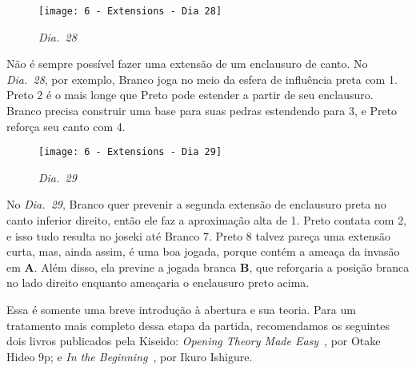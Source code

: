 \pagebreak

\begin{wrapfigure}{r}{60mm}
    \vspace{-15pt}
    \begin{center}
        \texttt{[image: 6 - Extensions - Dia 28]}
        \captionsetup{justification=centering}
        \caption*{\emph{Dia.\@~28}}
    \end{center}
    \vspace{-10pt}
\end{wrapfigure}

Não é sempre possível fazer uma extensão de um enclausuro de canto. No \emph{Dia.\@~28}, por exemplo, Branco joga no meio da esfera de influência preta com 1. Preto 2 é o mais longe que Preto pode estender a partir de seu enclausuro. Branco precisa construir uma base para suas pedras estendendo para 3, e Preto reforça seu canto com 4.

\begin{wrapfigure}{l}{60mm}
    \vspace{-27.5pt}
    \begin{center}
        \texttt{[image: 6 - Extensions - Dia 29]}
        \captionsetup{justification=centering}
        \caption*{\emph{Dia.\@~29}}
    \end{center}
    \vspace{-10pt}
\end{wrapfigure}

No \emph{Dia.\@~29}, Branco quer prevenir a segunda extensão de enclausuro preta no canto inferior direito, então ele faz a aproximação alta de 1. Preto contata com 2, e isso tudo resulta no joseki até Branco 7. Preto 8 talvez pareça uma extensão curta, mas, ainda assim, é uma boa jogada, porque contém a ameaça da invasão em \textbf{A}. Além disso, ela previne a jogada branca \textbf{B}, que reforçaria a posição branca no lado direito enquanto ameaçaria o enclausuro preto acima.

\bigskip

Essa é somente uma breve introdução à abertura e sua teoria. Para um tratamento mais completo dessa etapa da partida, recomendamos os seguintes dois livros publicados pela Kiseido: \emph{Opening Theory Made Easy}~\cite{otake_opening_theory_made_easy}, por Otake Hideo 9p; e \emph{In the Beginning}~\cite{ikure_in_the_beginning}, por Ikuro Ishigure.